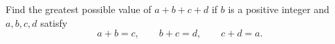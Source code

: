 Find the greatest possible value of $a+b+c+d$ if $b$ is a positive integer and $a,b,c,d$ satisfy
\[
a+b=c,\qquad b+c=d,\qquad c+d=a .
\]
